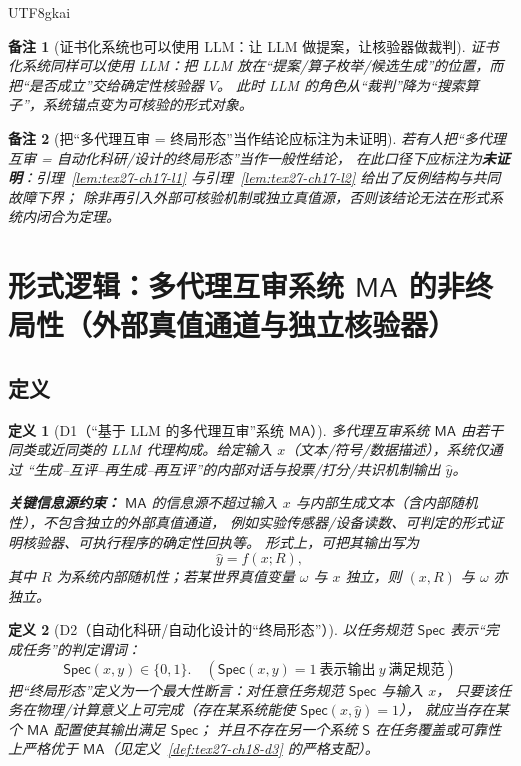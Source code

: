 \documentclass[12pt]{article}
\newtheorem{definition}{定义}[section]
\newtheorem{remark}{备注}[section]
\begin{document}
\begin{CJK*}{UTF8}{gkai}
\begin{remark}[证书化系统也可以使用 LLM：让 LLM 做提案，让核验器做裁判]
证书化系统同样可以使用 LLM：把 LLM 放在“提案/算子枚举/候选生成”的位置，而把“是否成立”交给确定性核验器 $V$。
此时 LLM 的角色从“裁判”降为“搜索算子”，系统锚点变为可核验的形式对象。
\end{remark}

\begin{remark}[把“多代理互审 = 终局形态”当作结论应标注为未证明]
若有人把“多代理互审 = 自动化科研/设计的终局形态”当作一般性结论，
在此口径下应标注为\textbf{未证明}：引理~\ref{lem:tex27-ch17-l1} 与引理~\ref{lem:tex27-ch17-l2} 给出了反例结构与共同故障下界；
除非再引入外部可核验机制或独立真值源，否则该结论无法在形式系统内闭合为定理。
\end{remark}

\clearpage

\section{形式逻辑：多代理互审系统 $\mathsf{MA}$ 的非终局性（外部真值通道与独立核验器）}
\label{sec:tex27-ch18-ma-not-final}

\subsection{定义}
\label{subsec:tex27-ch18-defs}

\begin{definition}[D1（“基于 LLM 的多代理互审”系统 $\mathsf{MA}$）]
\label{def:tex27-ch18-d1}
多代理互审系统 $\mathsf{MA}$ 由若干同类或近同类的 LLM 代理构成。给定输入 $x$（文本/符号/数据描述），系统仅通过
“生成--互评--再生成--再互评”的内部对话与投票/打分/共识机制输出 $\hat y$。

\vspace{0.5em}
\noindent\textbf{关键信息源约束：}
$\mathsf{MA}$ 的信息源不超过输入 $x$ 与内部生成文本（含内部随机性），不包含独立的外部真值通道，
例如实验传感器/设备读数、可判定的形式证明核验器、可执行程序的确定性回执等。
形式上，可把其输出写为
\[
  \hat y = f(x;R),
\]
其中 $R$ 为系统内部随机性；若某世界真值变量 $\omega$ 与 $x$ 独立，则 $(x,R)$ 与 $\omega$ 亦独立。
\end{definition}

\begin{definition}[D2（自动化科研/自动化设计的“终局形态”）]
\label{def:tex27-ch18-d2}
以任务规范 $\mathsf{Spec}$ 表示“完成任务”的判定谓词：
\[
  \mathsf{Spec}(x,y)\in\{0,1\}.
  \quad(\mathsf{Spec}(x,y)=1\ \text{表示输出}\ y\ \text{满足规范})
\]
把“终局形态”定义为一个最大性断言：对任意任务规范 $\mathsf{Spec}$ 与输入 $x$，
只要该任务在物理/计算意义上可完成（存在某系统能使 $\mathsf{Spec}(x,\hat y)=1$），
就应当存在某个 $\mathsf{MA}$ 配置使其输出满足 $\mathsf{Spec}$；
并且不存在另一个系统 $\mathsf{S}$ 在任务覆盖或可靠性上严格优于 $\mathsf{MA}$（见定义~\ref{def:tex27-ch18-d3} 的严格支配）。
\end{definition}


\end{CJK*}
\end{document}
